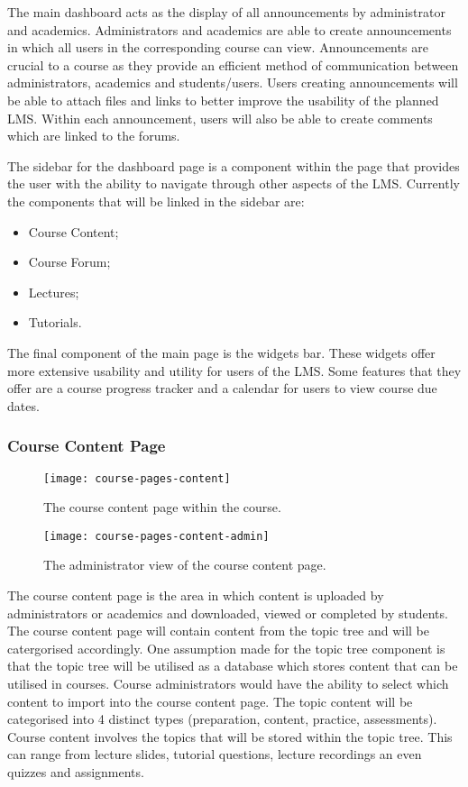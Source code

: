 The main dashboard acts as the display of all announcements by administrator and academics. Administrators and academics are able to create announcements in which all users in the corresponding course can view. 
Announcements are crucial to a course as they provide an efficient method of communication between administrators, academics and students/users.
Users creating announcements will be able to attach files and links to better improve the usability of the planned LMS.
Within each announcement, users will also be able to create comments which are linked to the forums.

The sidebar for the dashboard page is a component within the page that provides the user with the ability to navigate through other aspects of the LMS.
Currently the components that will be linked in the sidebar are:
\begin{itemize}
    \item Course Content;
    \item Course Forum;
    \item Lectures;
    \item Tutorials.
\end{itemize}

The final component of the main page is the widgets bar. These widgets offer more extensive usability and utility for users of the LMS.
Some features that they offer are a course progress tracker and a calendar for users to view course due dates. 

\subsubsection{Course Content Page}
\begin{figure}[h]
    \centering
    \texttt{[image: course-pages-content]}
    \caption{The course content page within the course.}
\end{figure}
\begin{figure}[h]
    \centering
    \texttt{[image: course-pages-content-admin]}
    \caption{The administrator view of the course content page.}
\end{figure}
The course content page is the area in which content is uploaded by administrators or academics and downloaded, viewed or completed by students.
The course content page will contain content from the topic tree and will be catergorised accordingly. 
One assumption made for the topic tree component is that the topic tree will be utilised as a database which stores content that can be utilised in courses.
Course administrators would have the ability to select which content to import into the course content page. 
The topic content will be categorised into 4 distinct types (preparation, content, practice, assessments).
Course content involves the topics that will be stored within the topic tree. This can range from lecture slides, tutorial questions, lecture recordings an even quizzes and assignments. 

